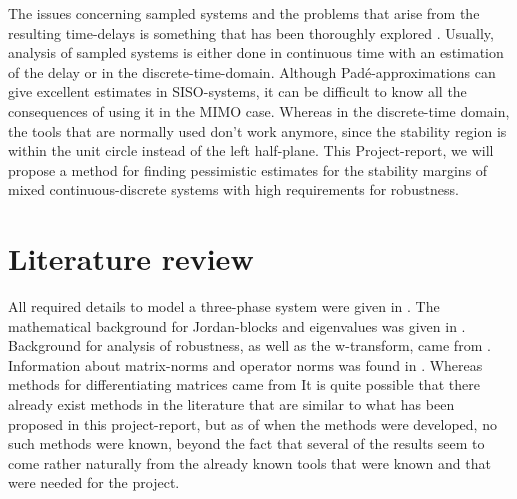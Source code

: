 The issues concerning sampled systems and the problems that arise from the resulting time-delays is something that has been thoroughly explored \cite{Suul_paper_2,RegTek_boken}. Usually, analysis of sampled systems is either done in continuous time with an estimation of the delay \cite{RegTek_boken} or in the discrete-time-domain\cite{Suul_paper_2, Disc_paper}. Although Padé-approximations can give excellent estimates in \gls{SISO}-systems, it can be difficult to know all the consequences of using it in the \gls{MIMO} case. Whereas in the discrete-time domain, the tools that are normally used don't work anymore, since the stability region is within the unit circle instead of the left half-plane. This Project-report, we will propose a method for finding pessimistic estimates for the stability margins of mixed continuous-discrete systems with high requirements for robustness. 

\section{Literature review}
All required details to model a three-phase system were given in \cite{eth_paper, Suul_paper_1,Suul_paper_2,Suul_electro_presentation_1}. The mathematical background for Jordan-blocks and eigenvalues was given in \cite{LinSys_boken}. Background for analysis of robustness, as well as the w-transform, came from \cite{RegTek_boken}. Information about matrix-norms and operator norms was found in \cite{Triangle_inequality_source}. Whereas methods for differentiating matrices came from \cite{Matrix_differentiation_source}
\noindent
It is quite possible that there already exist methods in the literature that are similar to what has been proposed in this project-report, but as of when  the methods were developed, no such methods were known, beyond the fact that several of the results seem to come rather naturally from the already known tools that were known and that were needed for the project. 

